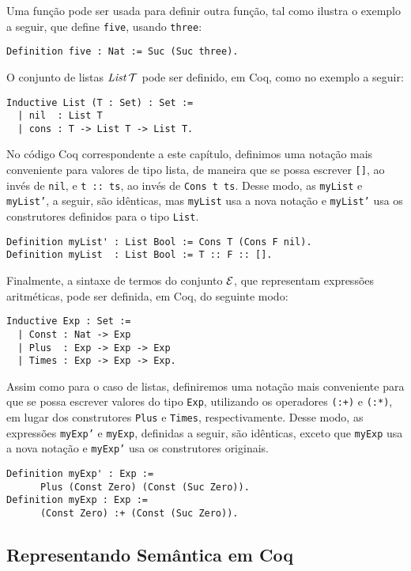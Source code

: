 Uma função pode ser usada para definir outra função, tal como ilustra o exemplo a seguir, que define \texttt{five}, usando \texttt{three}: 
\begin{lstlisting}
Definition five : Nat := Suc (Suc three).
\end{lstlisting}

O conjunto de listas $\textit{List\/}\,\mathcal{T}$ pode ser definido, em Coq, como no exemplo a seguir: 
\begin{lstlisting}
Inductive List (T : Set) : Set :=
  | nil  : List T
  | cons : T -> List T -> List T.
\end{lstlisting}

No código Coq correspondente a este capítulo, definimos uma nota\c{c}\~ao mais conveniente para valores de tipo lista, de maneira que se possa escrever \texttt{[]}, ao inv\'es de \texttt{nil}, e \texttt{t :: ts}, ao inv\'es de \texttt{Cons t ts}. Desse modo, as \texttt{myList} e \texttt{myList'}, a seguir, s\~ao id\^enticas, mas \texttt{myList} usa a nova notação e \texttt{myList'} usa os construtores definidos para o tipo \texttt{List}.
\begin{lstlisting}
Definition myList' : List Bool := Cons T (Cons F nil).
Definition myList  : List Bool := T :: F :: [].
\end{lstlisting}

Finalmente, a  sintaxe de termos do conjunto $\mathcal{E}$, que representam express\~oes aritm\'eticas, pode ser definida, em Coq, do seguinte modo:
\begin{lstlisting}
Inductive Exp : Set :=
  | Const : Nat -> Exp
  | Plus  : Exp -> Exp -> Exp
  | Times : Exp -> Exp -> Exp.
\end{lstlisting}


Assim como para o caso de listas, definiremos uma notação mais conveniente para que se possa escrever valores do tipo \texttt{Exp}, utilizando os operadores \texttt{(:+)} e \texttt{(:*)}, em lugar dos construtores \texttt{Plus} e \texttt{Times}, respectivamente. Desse modo, as expressões \texttt{myExp'} e \texttt{myExp}, definidas a seguir, são idênticas, exceto que \texttt{myExp} usa a nova notação e \texttt{myExp'} usa os construtores originais.
\begin{lstlisting}
Definition myExp' : Exp := 
      Plus (Const Zero) (Const (Suc Zero)).
Definition myExp : Exp := 
      (Const Zero) :+ (Const (Suc Zero)).
\end{lstlisting}

\subsection{Representando Sem\^antica em Coq}

